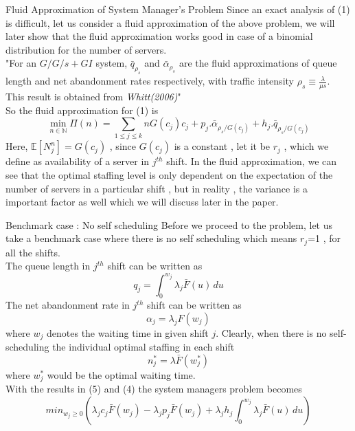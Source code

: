 \documentclass[9pt]{beamer}
\begin{document}
\begin{frame}{Fluid Approximation of System Manager's Problem}
Since an exact analysis of (1) is difficult, let us consider a fluid approximation of the above problem, we will later show that the fluid approximation works good in case of a binomial distribution for the number of servers. 
\\ "For an $G/G/s +GI$ system, $\bar{q}_{\rho_{s}}$ and $\bar{\alpha}_{\rho_{s}}$ are the fluid approximations of queue length and net abandonment rates respectively, with traffic intensity $\rho_{s} \equiv \frac{\lambda}{\mu s}$. This result is obtained from \textit{Whitt(2006)}"
\\ So the fluid approximation for (1) is
\begin{equation}
    \min_{n \in \mathbb{N}} \Pi(n) = \sum_{1 \leq j \leq k} {n G(c_j)c_j+p_j.\bar{\alpha}_{{\rho_{s}}/{G(c_j)}}+h_j.\bar{q}_{{\rho_{s}}/{G(c_j)}}}
\end{equation}
Here, $\mathbb{E}[N_{j}^{n}] = G(c_j)$ , since $G(c_j)$ is a constant , let it be $r_j$ , which we define as availability of a server in $j^{th}$ shift. In the fluid approximation, we can see that the optimal staffing level is only dependent on the expectation of the number of servers in a particular shift , but in reality , the variance is a important factor as well which we will discuss later in the paper.
\end{frame}
\begin{frame}{Benchmark case : No self scheduling}
    Before we proceed to the problem, let us take a benchmark case where there is no self scheduling which means $r_j$=1 , for all the shifts.\\ The queue length in $j^{th}$ shift can be written as 
 \begin{equation}
     q_j = \int_{0}^{w_j} \lambda_j \bar{F}(u)  \, du
 \end{equation}
  The net abandonment rate in $j^{th}$  shift can be written as
  \begin{equation}
      \alpha_j=\lambda_j F(w_j)
  \end{equation}
   where $w_j$ denotes the waiting time in given shift $j$.
 Clearly, when there is no self-scheduling the individual optimal staffing in each shift 
 \begin{equation}
     n_j^{*}=\lambda \bar{F}(w_j^{*})
 \end{equation}
  where $w_j^{*}$ would be the optimal waiting time.
\\With the results in (5) and (4) the system managers problem becomes
\begin{equation}
    min_{w_j \geq 0} \left( \lambda_j c_j \bar{F}(w_j) - \lambda_j p_j \bar{F}(w_j) + \lambda_j h_j\int_{0}^{w_j} \lambda_j \bar{F}(u)  \, du \right)
\end{equation}
\end{frame}
\end{document}
